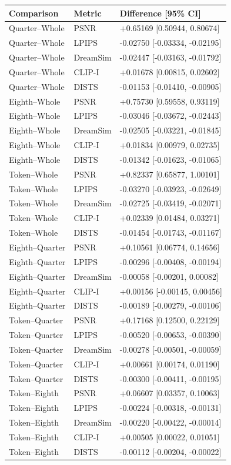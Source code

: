 \documentclass[10pt,letterpaper]{article}
\begin{document}
\begin{longtable}{@{}lll@{}}\toprule
Comparison & Metric & Difference [95\% CI]\\\midrule\endhead
Quarter--Whole & PSNR & +0.65169 [0.50944, 0.80674]\\
Quarter--Whole & LPIPS & -0.02750 [-0.03334, -0.02195]\\
Quarter--Whole & DreamSim & -0.02447 [-0.03163, -0.01792]\\
Quarter--Whole & CLIP-I & +0.01678 [0.00815, 0.02602]\\
Quarter--Whole & DISTS & -0.01153 [-0.01410, -0.00905]\\
Eighth--Whole & PSNR & +0.75730 [0.59558, 0.93119]\\
Eighth--Whole & LPIPS & -0.03046 [-0.03672, -0.02443]\\
Eighth--Whole & DreamSim & -0.02505 [-0.03221, -0.01845]\\
Eighth--Whole & CLIP-I & +0.01834 [0.00979, 0.02735]\\
Eighth--Whole & DISTS & -0.01342 [-0.01623, -0.01065]\\
Token--Whole & PSNR & +0.82337 [0.65877, 1.00101]\\
Token--Whole & LPIPS & -0.03270 [-0.03923, -0.02649]\\
Token--Whole & DreamSim & -0.02725 [-0.03419, -0.02071]\\
Token--Whole & CLIP-I & +0.02339 [0.01484, 0.03271]\\
Token--Whole & DISTS & -0.01454 [-0.01743, -0.01167]\\
Eighth--Quarter & PSNR & +0.10561 [0.06774, 0.14656]\\
Eighth--Quarter & LPIPS & -0.00296 [-0.00408, -0.00194]\\
Eighth--Quarter & DreamSim & -0.00058 [-0.00201, 0.00082]\\
Eighth--Quarter & CLIP-I & +0.00156 [-0.00145, 0.00456]\\
Eighth--Quarter & DISTS & -0.00189 [-0.00279, -0.00106]\\
Token--Quarter & PSNR & +0.17168 [0.12500, 0.22129]\\
Token--Quarter & LPIPS & -0.00520 [-0.00653, -0.00390]\\
Token--Quarter & DreamSim & -0.00278 [-0.00501, -0.00059]\\
Token--Quarter & CLIP-I & +0.00661 [0.00174, 0.01190]\\
Token--Quarter & DISTS & -0.00300 [-0.00411, -0.00195]\\
Token--Eighth & PSNR & +0.06607 [0.03357, 0.10063]\\
Token--Eighth & LPIPS & -0.00224 [-0.00318, -0.00131]\\
Token--Eighth & DreamSim & -0.00220 [-0.00422, -0.00014]\\
Token--Eighth & CLIP-I & +0.00505 [0.00022, 0.01051]\\
Token--Eighth & DISTS & -0.00112 [-0.00204, -0.00022]\\
\bottomrule\end{longtable}
\end{document}

